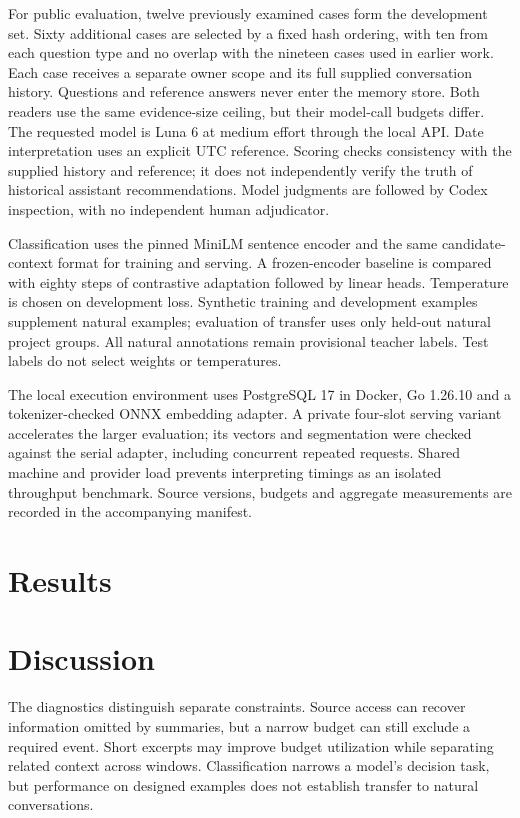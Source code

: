 \documentclass[11pt]{article}
\begin{document}
For public evaluation, twelve previously examined cases form the development set. Sixty additional cases are selected by a fixed hash ordering, with ten from each question type and no overlap with the nineteen cases used in earlier work. Each case receives a separate owner scope and its full supplied conversation history. Questions and reference answers never enter the memory store. Both readers use the same evidence-size ceiling, but their model-call budgets differ. The requested model is Luna 6 at medium effort through the local API. Date interpretation uses an explicit UTC reference. Scoring checks consistency with the supplied history and reference; it does not independently verify the truth of historical assistant recommendations. Model judgments are followed by Codex inspection, with no independent human adjudicator.

Classification uses the pinned MiniLM sentence encoder and the same candidate-context format for training and serving. A frozen-encoder baseline is compared with eighty steps of contrastive adaptation followed by linear heads. Temperature is chosen on development loss. Synthetic training and development examples supplement natural examples; evaluation of transfer uses only held-out natural project groups. All natural annotations remain provisional teacher labels. Test labels do not select weights or temperatures.

The local execution environment uses PostgreSQL 17 in Docker, Go 1.26.10 and a tokenizer-checked ONNX embedding adapter. A private four-slot serving variant accelerates the larger evaluation; its vectors and segmentation were checked against the serial adapter, including concurrent repeated requests. Shared machine and provider load prevents interpreting timings as an isolated throughput benchmark. Source versions, budgets and aggregate measurements are recorded in the accompanying manifest.

\section{Results}


\section{Discussion}
The diagnostics distinguish separate constraints. Source access can recover information omitted by summaries, but a narrow budget can still exclude a required event. Short excerpts may improve budget utilization while separating related context across windows. Classification narrows a model's decision task, but performance on designed examples does not establish transfer to natural conversations.
\end{document}
